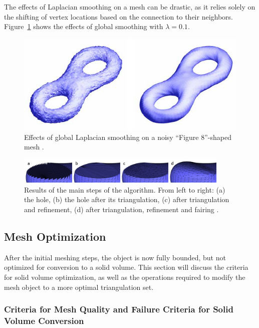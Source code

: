 \documentclass[12pt]{drexelthesis}
\let\Oldsubsection\subsection
\renewcommand{\subsection}{\FloatBarrier\Oldsubsection}
\let\Oldsubsubsection\subsubsection
\renewcommand{\subsubsection}{\FloatBarrier\Oldsubsubsection}
\begin{document}
The effects of Laplacian smoothing on a mesh can be drastic, as it relies solely on the shifting of vertex locations based on the connection to their neighbors. Figure~\ref{lapsmoothing} shows the effects of global smoothing with $\lambda=0.1$.

\begin{figure}[!ht]
	\centering
	\includegraphics{holefilling/laplaciansmoothinglamdaonetenth.png}
	\caption[Effects of global Laplacian smoothing with $\lambda=0.1$]{\centering Effects of global Laplacian smoothing on a noisy ``Figure 8''-shaped mesh \cite{laplacianimage}.}
	\label{lapsmoothing}
\end{figure}



\begin{figure}[!ht]
	\centering
	\includegraphics[width=4in]{hole_fill.jpg}
	\caption[visualization of hole filling, refinement, and fairing]{Results of the main steps of the algorithm. From left to right: (a) the hole, (b) the hole after its triangulation, (c) after triangulation and refinement, (d) after triangulation, refinement and fairing \cite{meshprocessing}.}
\end{figure}

\subsection{Mesh Optimization}
\label{subsec:meshoptimization}
After the initial meshing steps, the object is now fully bounded, but not optimized for conversion to a solid volume. This section will discuss the criteria for solid volume optimization, as well as the operations required to modify the mesh object to a more optimal triangulation set.

\subsubsection{Criteria for Mesh Quality and Failure Criteria for Solid Volume Conversion}
\end{document}
